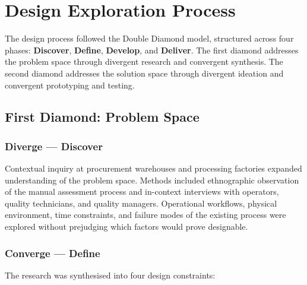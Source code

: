 
\chapter{Design Exploration Process}
\label{AppendixC}

\doublespacing

The design process followed the Double Diamond model, structured across four phases: \textbf{Discover}, \textbf{Define}, \textbf{Develop}, and \textbf{Deliver}. The first diamond addresses the problem space through divergent research and convergent synthesis. The second diamond addresses the solution space through divergent ideation and convergent prototyping and testing.

\section{First Diamond: Problem Space}

\subsection{Diverge — Discover}

Contextual inquiry at procurement warehouses and processing factories expanded understanding of the problem space. Methods included ethnographic observation of the manual assessment process and in-context interviews with operators, quality technicians, and quality managers. Operational workflows, physical environment, time constraints, and failure modes of the existing process were explored without prejudging which factors would prove designable.

\subsection{Converge — Define}

The research was synthesised into four design constraints:

